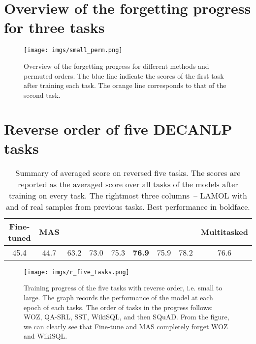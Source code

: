 \documentclass{article} \usepackage{iclr2020_conference,times}
\begin{document}
\clearpage
\section{Overview of the forgetting progress for three tasks}
\label{appendix:small_perm}
\begin{figure*}[!h]
  \texttt{[image: imgs/small\_perm.png]}
  \caption{Overview of the forgetting progress for different methods and permuted orders. The blue line indicate the scores of the first task after training each task. The orange line corresponds to that of the second task.}
  \label{fig:small_perm}
\end{figure*} 
\clearpage
\section{Reverse order of five DECANLP tasks}
\label{appendix:r_five_tasks}
\begin{table*}[h]
\centering
    \begin{adjustbox}{max width=\textwidth}
    \begin{tabular}{*{6}{c}||ccc}
    \toprule
    \small Fine-tuned & \small MAS & \small  & \small  & \small  & \small  & \small  & \small  & \small Multitasked \\
    \midrule
    45.4 & 44.7 & 63.2 & 73.0 & 75.3 & \textbf{76.9} & 75.9 & 78.2 & 76.6 \\
    \bottomrule
    \end{tabular}
    \end{adjustbox}
    \caption{Summary of averaged score on reversed five tasks. The scores are reported as the averaged score over all tasks of the models after training on every task. The rightmost three columns~-- LAMOL with  and  of real samples from previous tasks. Best performance in boldface.}
\label{tab:r_five_tasks}
\end{table*} 
\begin{figure*}[h]
  \centering
\texttt{[image: imgs/r\_five\_tasks.png]}
  
  \caption{Training progress of the five tasks with reverse order, i.e. small to large. The graph records the performance of the model at each epoch of each tasks. The order of tasks in the progress follows: WOZ, QA-SRL, SST, WikiSQL, and then SQuAD. From the figure, we can clearly see that Fine-tune and MAS completely forget WOZ and WikiSQL.}
  \label{fig:r_five_tasks}
\end{figure*}
 
\end{document}
